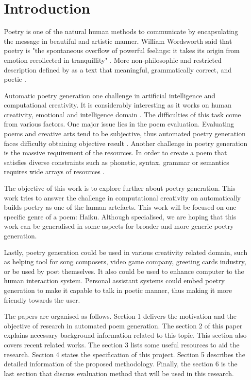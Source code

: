 \section{Introduction}



Poetry is one of the natural human methods to communicate by encapsulating the message in beautiful and artistic manner. William Wordsworth said that poetry is "the spontaneous overflow of powerful feelings: it takes its origin from emotion recollected in tranquillity" \cite{wordsworth1990preface}. More non-philosophic and restricted description defined by \citeauthor{manurung2004evolutionary} as a text that meaningful, grammatically correct, and poetic \cite{manurung2004evolutionary}.


Automatic poetry generation one challenge in artificial intelligence and computational creativity. It is considerably interesting as it works on human creativity, emotional and intelligence domain \cite{colton2012computational}. The difficulties of this task come from various factors. One major issue lies in the poem evaluation. Evaluating poems and creative arts tend to be subjective, thus automated poetry generation faces difficulty obtaining objective result \cite{binsted1996machine}. Another challenge in poetry generation is the massive requirement of the resources. In order to create a poem that satisfies diverse constraints such as phonetic, syntax, grammar or semantics requires wide arrays of resources \cite{manurung2000towards}. 


The objective of this work is to explore further about poetry generation. This work tries to answer the challenge in computational creativity on automatically builds poetry as one of the human artefacts. This work will be focused on one specific genre of a poem: Haiku. Although specialised, we are hoping that this work can be generalised in some aspects for broader and more generic poetry generation. 


Lastly, poetry generation could be used in various creativity related domain, such as helping tool for song composers, video game company, greeting cards industry, or be used by poet themselves. It also could be used to enhance computer to the human interaction system. Personal assistant systems could embed poetry generation to make it capable to talk in poetic manner, thus making it more friendly towards the user. 


The papers are organised as follows. Section 1 delivers the motivation and the objective of research in automated poem generation. The section 2 of this paper explains necessary background information related to this topic. This section also covers recent related works. The section 3 lists some useful resources to aid the research. Section 4 states the specification of this project. Section 5 describes the detailed information of the proposed methodology. Finally, the section 6 is the last section that discuss evaluation method that will be used in this research.

